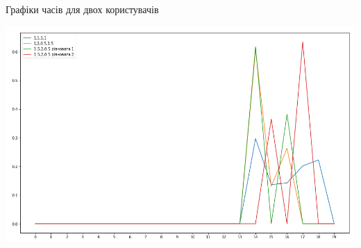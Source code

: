 \begin{frame}{Графіки часів для двох користувачів}
	\manimate
	
	\centering
	\includegraphics[width=0.6\linewidth]{im/nash_strategy_together}
\end{frame}




